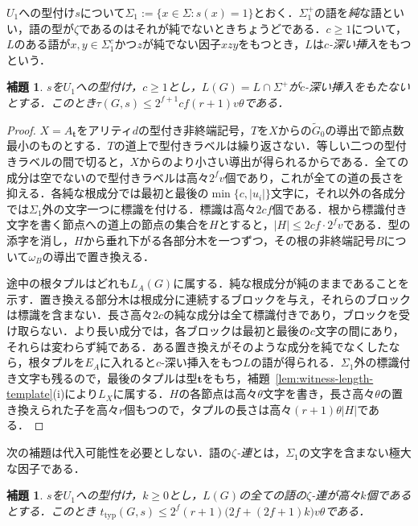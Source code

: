 \documentclass[11pt,a4paper]{ltjsarticle}
\numberwithin{equation}{section}
\theoremstyle{plain}
\newtheorem{lemma}[theorem]{補題}
\theoremstyle{definition}
\theoremstyle{remark}
\begin{document}
$U_1$への型付け$s$について$\Sigma_1:=\{x\in\Sigma:s(x)=1\}$とおく．$\Sigma_1^+$の語を\emph{純}な語といい，語の型が$\zeta$であるのはそれが純でないときちょうどである．$c\ge1$について，$L$のある語が$x,y\in\Sigma_1^c$かつ$z$が純でない因子$xzy$をもつとき，$L$は\emph{$c$-深い挿入}をもつという．

\begin{lemma}\label{lem:app-u1-shallow}
$s$を$U_1$への型付け，$c\ge1$とし，$L(G)=L\cap\Sigma^+$が$c$-深い挿入をもたないとする．このとき$\tau(G,s)\le2^{f+1}cf(r+1)v\theta$である．
\end{lemma}

\begin{proof}
$X=A_{\mathbf t}$をアリティ$d$の型付き非終端記号，$T$を$X$からの$\widetilde G_0$の導出で節点数最小のものとする．$T$の道上で型付きラベルは繰り返さない．等しい二つの型付きラベルの間で切ると，$X$からのより小さい導出が得られるからである．全ての成分は空でないので型付きラベルは高々$2^fv$個であり，これが全ての道の長さを抑える．各純な根成分では最初と最後の$\min\{c,|u_i|\}$文字に，それ以外の各成分では$\Sigma_1$外の文字一つに標識を付ける．標識は高々$2cf$個である．根から標識付き文字を書く節点への道上の節点の集合を$H$とすると，$|H|\le2cf\cdot2^fv$である．型の添字を消し，$H$から垂れ下がる各部分木を一つずつ，その根の非終端記号$B$について$\omega_B$の導出で置き換える．

途中の根タプルはどれも$L_A(G)$に属する．純な根成分が純のままであることを示す．置き換える部分木は根成分に連続するブロックを与え，それらのブロックは標識を含まない．長さ高々$2c$の純な成分は全て標識付きであり，ブロックを受け取らない．より長い成分では，各ブロックは最初と最後の$c$文字の間にあり，それらは変わらず純である．ある置き換えがそのような成分を純でなくしたなら，根タプルを$E_A$に入れると$c$-深い挿入をもつ$L$の語が得られる．$\Sigma_1$外の標識付き文字も残るので，最後のタプルは型$\mathbf t$をもち，補題~\ref{lem:witness-length-template}(i)により$L_X$に属する．$H$の各節点は高々$\theta$文字を書き，長さ高々$\theta$の置き換えられた子を高々$r$個もつので，タプルの長さは高々$(r+1)\theta|H|$である．
\end{proof}

次の補題は代入可能性を必要としない．語の\emph{$\zeta$-連}とは，$\Sigma_1$の文字を含まない極大な因子である．

\begin{lemma}\label{lem:app-u1-runs}
$s$を$U_1$への型付け，$k\ge0$とし，$L(G)$の全ての語の$\zeta$-連が高々$k$個であるとする．このとき
$t_{\mathrm{typ}}(G,s)\le2^f(r+1)\bigl(2f+(2f+1)k\bigr)v\theta$である．
\end{lemma}
\end{document}
